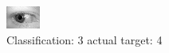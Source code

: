 \begin{figure}[h!]
\begin{center}
\includegraphics[width=0.60\columnwidth]{figures/ID756_class_3_target_4.png}
\end{center}
\caption{ Classification: 3 actual target: 4}
\label{fig:ID756_class_3_target_4}
\end{figure}
